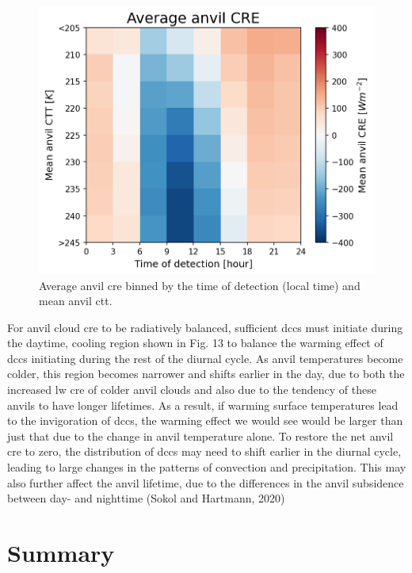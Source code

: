 \begin{figure}[tp]
    \includegraphics[width=\textwidth]{figures/ch3_13.png}
    \caption[
    Average anvil \acrshort{cre} binned by the time of detection (local time) and mean anvil \acrshort{ctt}
    ]{
    Average anvil \acrshort{cre} binned by the time of detection (local time) and mean anvil \acrshort{ctt}.
    }
    \label{fig:anvil_cre_time_vs_ctt}
\end{figure}


For anvil cloud \acrshort{cre} to be radiatively balanced, sufficient \acrshort{dcc}s must
initiate during the daytime, cooling region shown in Fig. 13 to balance
the warming effect of \acrshort{dcc}s initiating during the rest of the diurnal
cycle. As anvil temperatures become colder, this region becomes narrower
and shifts earlier in the day, due to both the increased \acrshort{lw} \acrshort{cre} of
colder anvil clouds and also due to the tendency of these anvils to have
longer lifetimes. As a result, if warming surface temperatures lead to
the invigoration of \acrshort{dcc}s, the warming effect we would see would be
larger than just that due to the change in anvil temperature alone. To
restore the net anvil \acrshort{cre} to zero, the distribution of \acrshort{dcc}s may need to
shift earlier in the diurnal cycle, leading to large changes in the
patterns of convection and precipitation. This may also further affect
the anvil lifetime, due to the differences in the anvil subsidence
between day- and nighttime (Sokol and Hartmann, 2020)

\section{Summary}

